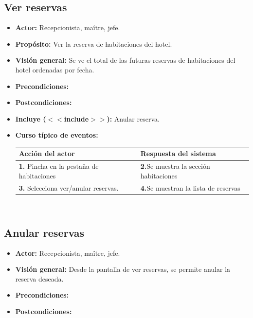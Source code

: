 \documentclass[spanish,a4paper,11pt, twoside]{report}	%
\begin{document}
	\subsection{Ver reservas}
		\begin{itemize}
			\item \textbf{Actor:} Recepcionista, maître, jefe.
			\item \textbf{Propósito:} Ver la reserva de habitaciones del hotel.
			\item \textbf{Visión general:} Se ve el total de las futuras reservas de habitaciones del hotel ordenadas por fecha.
			\item \textbf{Precondiciones:} 
			\item \textbf{Postcondiciones:} 
			\item \textbf{Incluye ($<<$include$>>$):} Anular reserva.
			\item \textbf{Curso típico de eventos:} 	\\
				\begin{tabular}{|p{6cm}||p{6cm}|}
				\hline
				\textbf{Acción del actor} & \textbf{Respuesta del sistema} \\ \hline
				\textbf{1.} Pincha en la pestaña de habitaciones & \textbf{2.}Se muestra la sección habitaciones \\ \hline 
				\textbf{3.} Selecciona ver/anular reservas. & \textbf{4.}Se muestran la lista de reservas \\ \hline
			\end{tabular}
			\\
		\end {itemize}


	\subsection{Anular reservas}
		\begin{itemize}
			\item \textbf{Actor:} Recepcionista, maître, jefe.
			\item \textbf{Visión general:} Desde la pantalla de ver reservas, se permite anular la reserva deseada. 		
			\item \textbf{Precondiciones:} 
			\item \textbf{Postcondiciones:} 
		\end {itemize}

\end{document}
